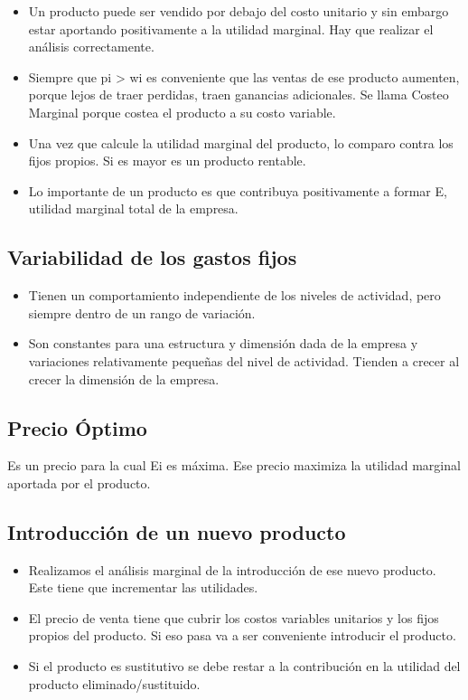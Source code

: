 \documentclass[titlepage,a4paper]{article}
\begin{document}
\begin{itemize}
\item Un producto puede ser vendido por debajo del costo unitario y sin embargo estar aportando positivamente a la utilidad marginal. Hay que realizar el análisis correctamente.
\item Siempre que pi > wi es conveniente que las ventas de ese producto aumenten, porque lejos de traer perdidas, traen ganancias adicionales. Se llama Costeo Marginal porque costea el producto a su costo variable.
\item Una vez que calcule la utilidad marginal del producto, lo comparo contra los fijos propios. Si es mayor es un producto rentable. 
\item Lo importante de un producto es que contribuya positivamente a formar E, utilidad marginal total de la empresa.
\end{itemize}


\subsection*{Variabilidad de los gastos fijos}

\begin{itemize}
\item Tienen un comportamiento independiente de los niveles de actividad, pero siempre dentro de un rango de variación.
\item Son constantes para una estructura y dimensión dada de la empresa y variaciones relativamente pequeñas del nivel de actividad. Tienden a crecer al crecer la dimensión de la empresa.
\end{itemize}

\subsection*{Precio Óptimo}
Es un precio para la cual Ei es máxima. Ese precio maximiza la utilidad marginal aportada por el producto.


\subsection*{Introducción de un nuevo producto}

\begin{itemize}
\item Realizamos el análisis marginal de la introducción de ese nuevo producto. Este tiene que incrementar las utilidades.
\item El precio de venta tiene que cubrir los costos variables unitarios y los fijos propios del producto. Si eso pasa va a ser conveniente introducir el producto.
\item Si el producto es sustitutivo se debe restar a la contribución en la utilidad del producto eliminado/sustituido.
\end{itemize}
\end{document}
